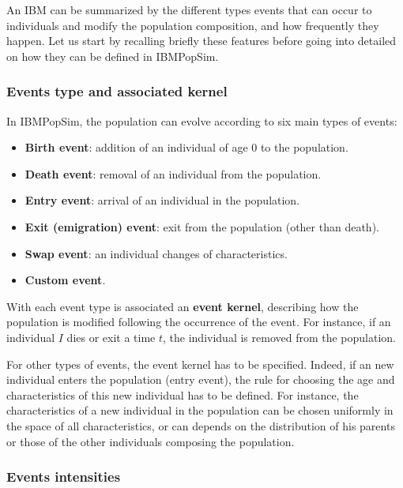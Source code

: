 An IBM can be summarized by the different types events that can occur to individuals and modify the population composition, and how frequently they happen. Let us start by recalling briefly these features before going into detailed on how they can be defined in IBMPopSim.

\hypertarget{eventsTh}{%
\subsubsection{Events type and associated kernel}\label{eventsTh}}

In IBMPopSim, the population can evolve according to six main types of events:

\begin{itemize}
\tightlist
\item
  \textbf{Birth event}: addition of an individual of age 0 to the population.
\item
  \textbf{Death event}: removal of an individual from the population.
\item
  \textbf{Entry event}: arrival of an individual in the population.
\item
  \textbf{Exit (emigration) event}: exit from the population (other than death).
\item
  \textbf{Swap event}: an individual changes of characteristics.
\item
  \textbf{Custom event}.
\end{itemize}

With each event type is associated an \textbf{event kernel}, describing how the population is modified following the occurrence of the event. For instance, if an individual \(I\) dies or exit a time \(t\), the individual is removed from the population.

For other types of events, the event kernel has to be specified. Indeed, if an new individual enters the population (entry event), the rule for choosing the age and characteristics of this new individual has to be defined. For instance, the characteristics of a new individual in the population can be chosen uniformly in the space of all characteristics, or can depends on the distribution of his parents or those of the other individuals composing the population.

\hypertarget{Eventintensityth}{%
\subsubsection{Events intensities}\label{Eventintensityth}}

